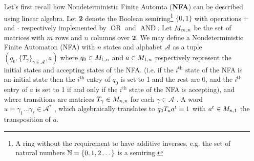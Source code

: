 Let's first recall how Nondeterministic Finite Automta (\textbf{NFA}) can be described using linear algebra. Let $\mathbf{2}$ denote the Boolean semiring\footnote{A ring without the requirement to have additive inverses, e.g. the set of natural numbers $\mathbb{N}=\{0,1,2\dots\}$ is a semiring.} $\{0,1\}$ with operations $+$ and $\cdot$ respectively implemented by $\operatorname{OR}$ and $\operatorname{AND}$.
Let $M_{m,n}$ be the set of matrices with $m$ rows and $n$ columns over $\mathbf{2}$. We may define a Nondeterministic Finite Automaton (NFA) with $n$ states and alphabet $\mathcal{A}$ as a tuple $(q_0, \{T_\gamma\}_{\gamma \in \mathcal{A}}, a)$ where $q_0 \in M_{1,n}$ and $a \in M_{1,n}$ respectively represent the initial states and accepting states of the NFA. (i.e. if the $i^\text{th}$ state of the NFA is an initial state then the $i^\text{th}$ entry of $q_0$ is set to 1 and the rest are 0, and the $i^\text{th}$ entry of $a$ is set to 1 if and only if the $i^\text{th}$ state of the NFA is accepting), and where transitions are matrices $T_\gamma\in M_{n,n}$ for each $\gamma\in\mathcal{A}$ . A word $u=\gamma_1\dots\gamma_\ell \in \mathcal{A}^*$ , which algebraically translates to $q_0 T_u a^t = 1$ with $a^t \in M_{n,1}$ the transposition of $a$. 

